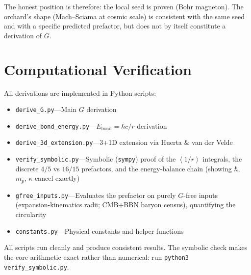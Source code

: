 \documentclass[11pt,letterpaper]{article}
\newcommand{\av}[1]{\left\langle #1 \right\rangle}
\begin{document}
The honest position is therefore: the local seed is proven (Bohr
magneton). The orchard's shape (Mach--Sciama at cosmic scale) is
consistent with the same seed and with a specific predicted
prefactor, but does not by itself constitute a derivation of $G$.

\section{Computational Verification}

All derivations are implemented in Python scripts:

\begin{itemize}
  \item \texttt{derive\_G.py}---Main $G$ derivation
  \item \texttt{derive\_bond\_energy.py}---$E_{\mathrm{bond}} = \hbar c/r$ derivation
  \item \texttt{derive\_3d\_extension.py}---3+1D extension via Huerta \& van der Velde
  \item \texttt{verify\_symbolic.py}---Symbolic (\texttt{sympy}) proof of the
    $\av{1/r}$ integrals, the discrete $4/5$ vs $16/15$ prefactors, and the
    energy-balance chain (showing $\hbar$, $m_p$, $\kappa$ cancel exactly)
  \item \texttt{gfree\_inputs.py}---Evaluates the prefactor on purely $G$-free
    inputs (expansion-kinematics radii; CMB$+$BBN baryon census), quantifying
    the circularity
  \item \texttt{constants.py}---Physical constants and helper functions
\end{itemize}

All scripts run cleanly and produce consistent results. The symbolic check makes
the core arithmetic exact rather than numerical: run
\texttt{python3 verify\_symbolic.py}.



\end{document}
